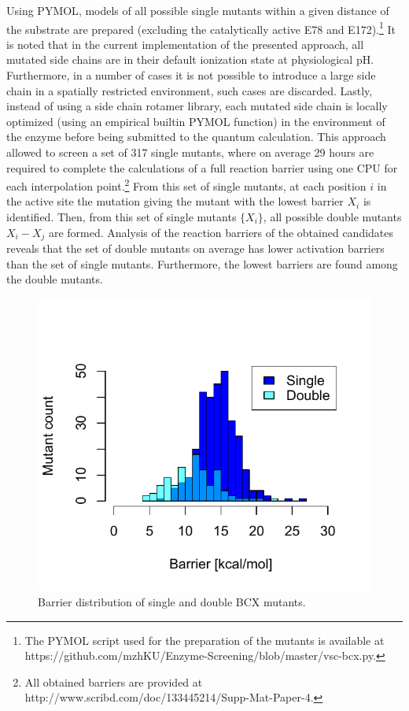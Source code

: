 Using PYMOL\cite{PyMOLu}, models of all possible single mutants within a given distance of the substrate are prepared (excluding the catalytically active E78 and E172).\footnote{The PYMOL script used for the preparation of the mutants is available at https://github.com/mzhKU/Enzyme-Screening/blob/master/vsc-bcx.py.}
It is noted that in the current implementation of the presented approach, all mutated side chains are in their default ionization state at physiological pH.
Furthermore, in a number of cases it is not possible to introduce a large side chain in a spatially restricted environment, such cases are discarded.
Lastly, instead of using a side chain rotamer library, each mutated side chain is locally optimized (using an empirical builtin PYMOL function) in the environment of the enzyme before being submitted to the quantum calculation.
This approach allowed to screen a set of 317 single mutants, where on average 29 hours are required to complete the calculations of a full reaction barrier using one CPU for each interpolation point.\footnote{All obtained barriers are provided at http://www.scribd.com/doc/133445214/Supp-Mat-Paper-4.}
From this set of single mutants, at each position $i$ in the active site the mutation giving the mutant with the lowest barrier $X_i$ is identified.
Then, from this set of single mutants $\{X_i\}$, all possible double mutants $X_i-X_j$ are formed.
Analysis of the reaction barriers of the obtained candidates reveals that the set of double mutants on average has lower activation barriers than the set of single mutants.
Furthermore, the lowest barriers are found among the double mutants.
\begin{figure}[htbp] 
\centering
\includegraphics[width=0.95\linewidth]{barrier-distribution.pdf}
\caption{
Barrier distribution of single and double BCX mutants\cite{hediger2013computational}.
}
\label{fig:bcx_barrier_distribution}
\end{figure}
